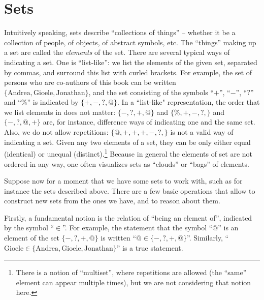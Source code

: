 

\section{Sets}


Intuitively speaking, sets describe ``collections of things'' -- whether it be a collection of people, of objects, of abstract symbols, etc.  The ``things'' making up a set are called the \emph{elements} of the set. There are several typical ways of indicating a set. One is ``list-like'':   we list the elements of the given set, separated by commas, and surround this list with curled brackets. For example, the set of persons who are co-authors of this book can be written $\{ \text{Andrea}, \text{Gioele}, \text{Jonathan} \}$, and the set consisting of the symbols ``$+$'', ``$-$'', ``$?$'' and ``$\%$'' is indicated by $\{ +, -, ?, @ \}$. In a ``list-like" representation, the order that we list elements in does not matter: $\{ -, ?, +, @ \}$ and $\{ \%, +, -, ?, \}$ and $\{ -, ?, @, + \}$ are, for instance, difference ways of indicating one and the same set. Also, we do not allow repetitions: $\{ @, +, +, +, -, ?, \}$ is not a valid way of indicating a set. Given any two elements of a set, they can be only either equal (identical) or unequal (distinct).\footnote{There is a notion of ``multiset'', where repetitions are allowed (the ``same'' element can appear multiple times), but we are not considering that notion here.} Because in general the elements of set are not ordered in any way, one often visualizes sets as ``clouds'' or ``bags'' of elements. 




Suppose now for a moment that we have some sets to work with, such as for instance the sets described above.
There are a few basic operations that allow to construct new sets from the ones we have, and to reason about them.


Firstly, a fundamental notion is the relation of ``being an element of'', indicated by the symbol ``$\in$''.
For example, the statement that the symbol ``$@$'' is an element of the set $\{ -, ?, +, @ \}$ is written ``$@ \in \{ -, ?, +, @ \}$''.
Similarly, ``$\text{Gioele} \in \{ \text{Andrea}, \text{Gioele}, \text{Jonathan} \}$'' is a true statement.

